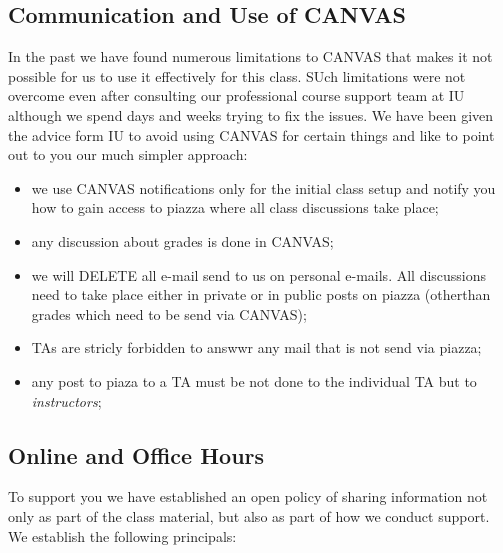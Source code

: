 \subsection{Communication and Use of CANVAS}

In the past we have found numerous limitations to CANVAS that makes it
not possible for us to use it effectively for this class. SUch
limitations were not overcome even after consulting our professional
course support team at IU although we spend days and weeks trying to
fix the issues. We have been given the advice form IU to avoid using
CANVAS for certain things and like to point out to you our much
simpler approach:

\begin{itemize}

\item we use CANVAS notifications only for the initial class setup and
  notify you how to gain access to piazza where all class discussions
  take place;

\item any discussion about grades is done in CANVAS;

\item we will DELETE all e-mail send to us on personal e-mails. All
  discussions need to take place either in private or in public posts
  on piazza (otherthan grades which need to be send via CANVAS);

\item TAs are stricly forbidden to answwr any mail that is not send
  via piazza;

\item any post to piaza to a TA must be not done to the individual TA
  but to {\em instructors};

\end{itemize}

\subsection{Online  and Office Hours}

To support you we have established an open policy of sharing
information not only as part of the class material, but also as part
of how we conduct support. We establish the following principals:

